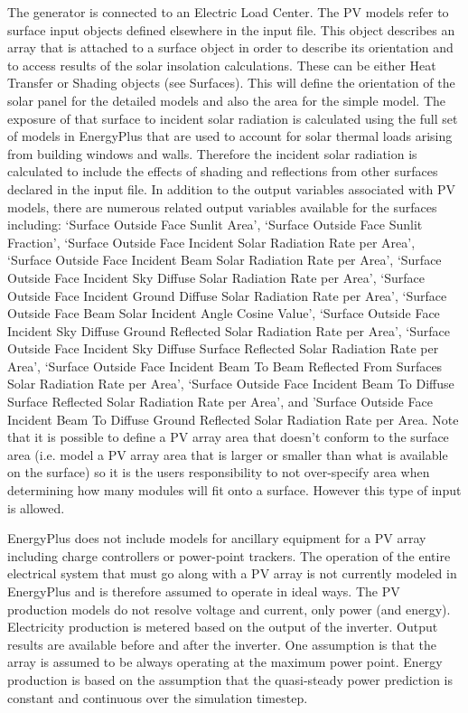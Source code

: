 The generator is connected to an Electric Load Center. The PV models refer to surface input objects defined elsewhere in the input file. This object describes an array that is attached to a surface object in order to describe its orientation and to access results of the solar insolation calculations. These can be either Heat Transfer or Shading objects (see Surfaces). This will define the orientation of the solar panel for the detailed models and also the area for the simple model. The exposure of that surface to incident solar radiation is calculated using the full set of models in EnergyPlus that are used to account for solar thermal loads arising from building windows and walls. Therefore the incident solar radiation is calculated to include the effects of shading and reflections from other surfaces declared in the input file. In addition to the output variables associated with PV models, there are numerous related output variables available for the surfaces including: `Surface Outside Face Sunlit Area', `Surface Outside Face Sunlit Fraction', `Surface Outside Face Incident Solar Radiation Rate per Area', `Surface Outside Face Incident Beam Solar Radiation Rate per Area', `Surface Outside Face Incident Sky Diffuse Solar Radiation Rate per Area', `Surface Outside Face Incident Ground Diffuse Solar Radiation Rate per Area', `Surface Outside Face Beam Solar Incident Angle Cosine Value', `Surface Outside Face Incident Sky Diffuse Ground Reflected Solar Radiation Rate per Area', `Surface Outside Face Incident Sky Diffuse Surface Reflected Solar Radiation Rate per Area', `Surface Outside Face Incident Beam To Beam Reflected From Surfaces Solar Radiation Rate per Area', `Surface Outside Face Incident Beam To Diffuse Surface Reflected Solar Radiation Rate per Area', and 'Surface Outside Face Incident Beam To Diffuse Ground Reflected Solar Radiation Rate per Area. Note that it is possible to define a PV array area that doesn't conform to the surface area (i.e. model a PV array area that is larger or smaller than what is available on the surface) so it is the users responsibility to not over-specify area when determining how many modules will fit onto a surface. However this type of input is allowed.

EnergyPlus does not include models for ancillary equipment for a PV array including charge controllers or power-point trackers. The operation of the entire electrical system that must go along with a PV array is not currently modeled in EnergyPlus and is therefore assumed to operate in ideal ways. The PV production models do not resolve voltage and current, only power (and energy). Electricity production is metered based on the output of the inverter. Output results are available before and after the inverter. One assumption is that the array is assumed to be always operating at the maximum power point. Energy production is based on the assumption that the quasi-steady power prediction is constant and continuous over the simulation timestep.

